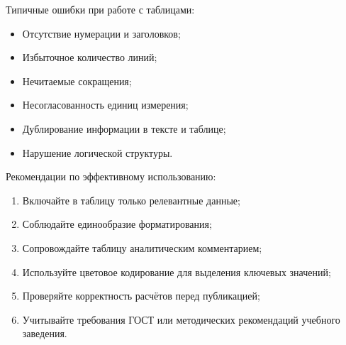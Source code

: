 \documentclass{ou}
\begin{document}
Типичные ошибки при работе с таблицами:
\begin{itemize}[label=-, leftmargin=0em, itemindent=3.35em, nosep]
\item Отсутствие нумерации и заголовков;
\item Избыточное количество линий;
\item Нечитаемые сокращения;
\item Несогласованность единиц измерения;
\item Дублирование информации в тексте и таблице;
\item Нарушение логической структуры.
\end{itemize}

Рекомендации по эффективному использованию:
\begin{enumerate}[leftmargin=0em, itemindent=3.75em, nosep, label=\arabic*)]
\item Включайте в таблицу только релевантные данные;
\item Соблюдайте единообразие форматирования;
\item Сопровождайте таблицу аналитическим комментарием;
\item Используйте цветовое кодирование для выделения ключевых значений;
\item Проверяйте корректность расчётов перед публикацией;
\item Учитывайте требования ГОСТ или методических рекомендаций учебного заведения.
\end{enumerate}
\newpage
{
\sloppy
\nocite{*}
\cleardoublepage
{}


}
\end{document}
